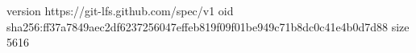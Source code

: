 version https://git-lfs.github.com/spec/v1
oid sha256:ff37a7849aec2df6237256047effeb819f09f01be949c71b8dc0c41e4b0d7d88
size 5616
